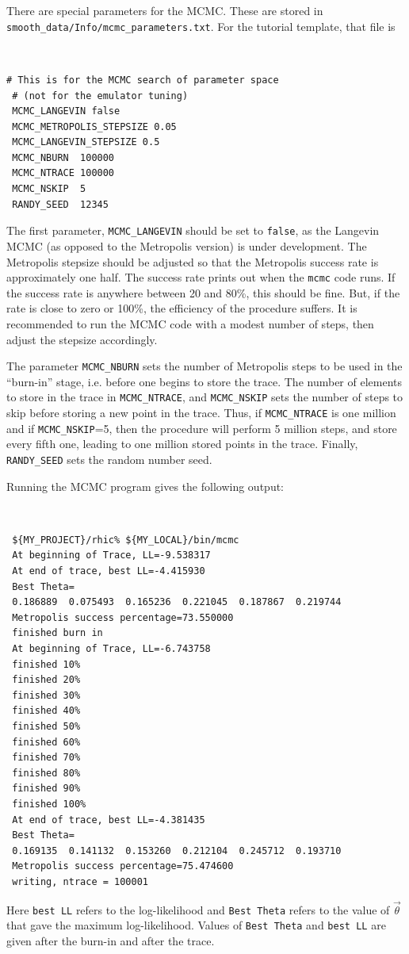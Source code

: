 \documentclass[UserManual.tex]{subfiles}
\begin{document}
There are special parameters for the MCMC. These are stored in {\tt smooth\_data/Info/mcmc\_parameters.txt}. For the tutorial template, that file is
{\tt
\begin{verbatim}
# This is for the MCMC search of parameter space
 # (not for the emulator tuning)
 MCMC_LANGEVIN false
 MCMC_METROPOLIS_STEPSIZE 0.05
 MCMC_LANGEVIN_STEPSIZE 0.5
 MCMC_NBURN  100000
 MCMC_NTRACE 100000
 MCMC_NSKIP  5
 RANDY_SEED  12345
\end{verbatim}}
The first parameter, {\tt MCMC\_LANGEVIN} should be set to {\tt false}, as the Langevin MCMC (as opposed to the Metropolis version) is under development. The Metropolis stepsize should be adjusted so that the Metropolis success rate is approximately one half. The success rate prints out when the {\tt mcmc} code runs. If the success rate is anywhere between 20 and 80\%, this should be fine. But, if the rate is close to zero or 100\%, the efficiency of the procedure suffers. It is recommended to run the MCMC code with a modest number of steps, then adjust the stepsize accordingly.

The parameter {\tt MCMC\_NBURN} sets the number of Metropolis steps to be used in the ``burn-in'' stage, i.e. before one begins to store the trace. The number of elements to store in the trace in {\tt MCMC\_NTRACE}, and {\tt MCMC\_NSKIP} sets the number of steps to skip before storing a new point in the trace. Thus, if {\tt MCMC\_NTRACE} is one million and if {\tt MCMC\_NSKIP}=5, then the procedure will perform 5 million steps, and store every fifth one, leading to one million stored points in the trace. Finally, {\tt RANDY\_SEED} sets the random number seed. 

Running the MCMC program gives the following output:
{\tt
\begin{verbatim}
 ${MY_PROJECT}/rhic% ${MY_LOCAL}/bin/mcmc
 At beginning of Trace, LL=-9.538317
 At end of trace, best LL=-4.415930
 Best Theta=
 0.186889  0.075493  0.165236  0.221045  0.187867  0.219744
 Metropolis success percentage=73.550000
 finished burn in
 At beginning of Trace, LL=-6.743758
 finished 10%
 finished 20%
 finished 30%
 finished 40%
 finished 50%
 finished 60%
 finished 70%
 finished 80%
 finished 90%
 finished 100%
 At end of trace, best LL=-4.381435
 Best Theta=
 0.169135  0.141132  0.153260  0.212104  0.245712  0.193710
 Metropolis success percentage=75.474600
 writing, ntrace = 100001
\end{verbatim}}
Here {\tt best LL} refers to the log-likelihood and {\tt Best Theta} refers to the value of $\vec{\theta}$ that gave the maximum log-likelihood. Values of {\tt Best Theta} and {\tt best LL} are given after the burn-in and after the trace. 
\end{document}
